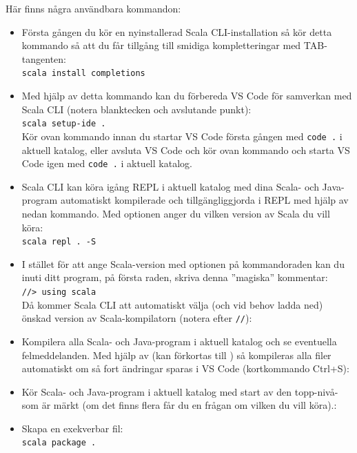 Här finns några användbara kommandon:
\begin{itemize}
\item Första gången du kör en nyinstallerad Scala CLI-installation så kör detta kommando så att du får tillgång till smidiga kompletteringar med TAB-tangenten:\\
\texttt{scala install completions}

\item Med hjälp av detta kommando kan du förbereda VS Code för samverkan med Scala CLI (notera blanktecken och avslutande punkt):\\ 
\texttt{scala setup-ide .}\\
Kör ovan kommando innan du startar VS Code första gången med \texttt{code .} i aktuell katalog, eller avsluta VS Code och kör ovan kommando och starta VS Code igen med \texttt{code .}  i aktuell katalog.


\item Scala CLI kan köra igång REPL i aktuell katalog med dina Scala- och Java-program automatiskt kompilerade och tillgängliggjorda i REPL med hjälp av nedan kommando. Med optionen  anger du vilken version av Scala du vill köra:\\
\texttt{scala repl . -S \ScalaVersion}

\item I stället för att ange Scala-version med optionen  på kommandoraden kan du inuti ditt program, på första raden, skriva denna ''magiska'' kommentar:\\ 
\texttt{//> using scala \ScalaVersion} \\
Då kommer Scala CLI att automatiskt välja (och vid behov ladda ned) önskad version av Scala-kompilatorn (notera \code{>} efter \texttt{//}):

\item Kompilera alla Scala- och Java-program i aktuell katalog och se eventuella felmeddelanden. Med hjälp av  (kan förkortas till ) så kompileras alla filer automatiskt om så fort ändringar sparas i VS Code (kortkommando Ctrl+S):\\

\item Kör Scala- och Java-program i aktuell katalog med start av den topp-nivå- som är märkt  (om det finns flera får du en frågan om vilken  du vill köra).:\\

\item Skapa en exekverbar fil:\\
\texttt{scala package .}


\end{itemize}
